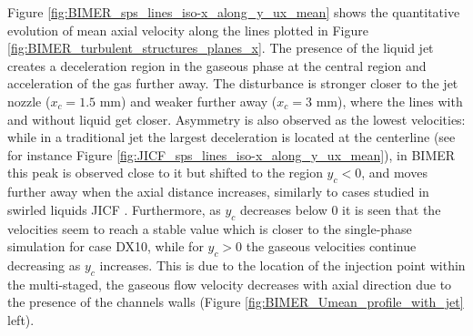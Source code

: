 Figure \ref{fig:BIMER_sps_lines_iso-x_along_y_ux_mean} shows the quantitative evolution of mean axial velocity along the lines plotted in Figure \ref{fig:BIMER_turbulent_structures_planes_x}. The presence of the liquid jet creates a deceleration region in the gaseous phase at the central region and acceleration of the gas further away. The disturbance is stronger closer to the jet nozzle ($x_c = 1.5$ mm) and weaker further away ($x_c = 3$ mm), where the lines with and without liquid get closer. Asymmetry is also observed as the lowest velocities: while in a traditional jet the largest deceleration is located at the centerline (see for instance Figure \ref{fig:JICF_sps_lines_iso-x_along_y_ux_mean}), in BIMER this peak is observed close to it but shifted to the region $y_c < 0$, and moves further away when the axial distance increases, similarly to cases studied in swirled liquids JICF . Furthermore, as $y_c$ decreases below $0$ it is seen that the velocities seem to reach a stable value which is closer to the single-phase simulation for case DX10, while for $y_c > 0$ the gaseous velocities continue decreasing as $y_c$ increases. This is due to the location of the injection point within the multi-staged, the gaseous flow velocity decreases with axial direction due to the presence of the channels walls (Figure \ref{fig:BIMER_Umean_profile_with_jet} left).





